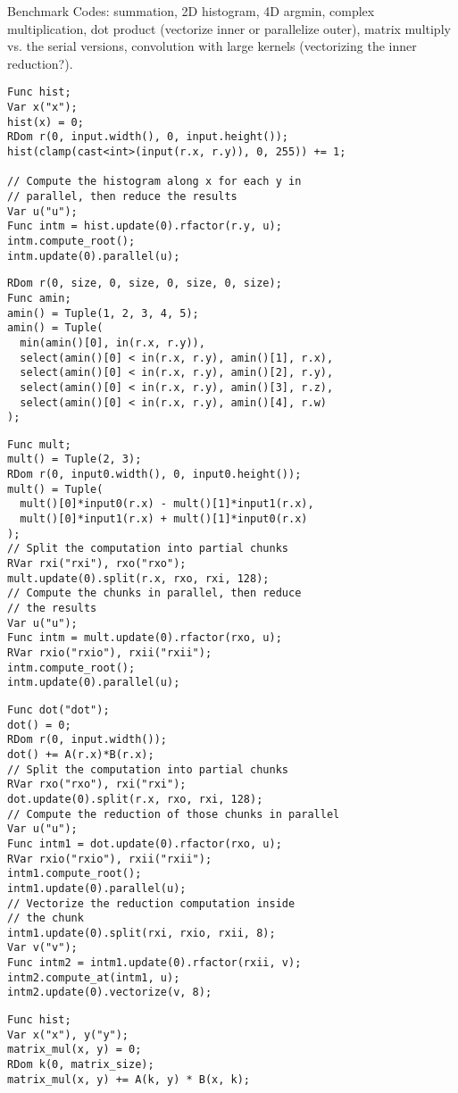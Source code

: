 Benchmark Codes:
summation, 2D histogram, 4D argmin, complex multiplication, dot product (vectorize inner or parallelize outer), matrix multiply vs. the serial versions, convolution with large kernels (vectorizing the inner reduction?). 

\begin{lstlisting}[caption={Benchmark code for histogram of a two-dimensional image.}, label={lst:benchmark_histogram}]
Func hist;
Var x("x");
hist(x) = 0;
RDom r(0, input.width(), 0, input.height());
hist(clamp(cast<int>(input(r.x, r.y)), 0, 255)) += 1;

// Compute the histogram along x for each y in
// parallel, then reduce the results
Var u("u");
Func intm = hist.update(0).rfactor(r.y, u);
intm.compute_root();
intm.update(0).parallel(u);
\end{lstlisting}

\begin{lstlisting}[caption={Benchmark code for argmin over 4D array}, label={lst:benchmark_argmin}]
RDom r(0, size, 0, size, 0, size, 0, size);
Func amin;
amin() = Tuple(1, 2, 3, 4, 5);
amin() = Tuple(
  min(amin()[0], in(r.x, r.y)),
  select(amin()[0] < in(r.x, r.y), amin()[1], r.x),
  select(amin()[0] < in(r.x, r.y), amin()[2], r.y),
  select(amin()[0] < in(r.x, r.y), amin()[3], r.z),
  select(amin()[0] < in(r.x, r.y), amin()[4], r.w)
);
\end{lstlisting}

\begin{lstlisting}[caption={Benchmark code for multiplication of complex number}, label={lst:benchmark_complex_multiply}]
Func mult;
mult() = Tuple(2, 3);
RDom r(0, input0.width(), 0, input0.height());
mult() = Tuple(
  mult()[0]*input0(r.x) - mult()[1]*input1(r.x),
  mult()[0]*input1(r.x) + mult()[1]*input0(r.x)
);
// Split the computation into partial chunks
RVar rxi("rxi"), rxo("rxo");
mult.update(0).split(r.x, rxo, rxi, 128);
// Compute the chunks in parallel, then reduce 
// the results
Var u("u");
Func intm = mult.update(0).rfactor(rxo, u);
RVar rxio("rxio"), rxii("rxii");
intm.compute_root();
intm.update(0).parallel(u);
\end{lstlisting}

\begin{lstlisting}[caption={Benchmark code for dot product}, label={lst:benchmark_dot_product}]
Func dot("dot");
dot() = 0;
RDom r(0, input.width());
dot() += A(r.x)*B(r.x);
// Split the computation into partial chunks
RVar rxo("rxo"), rxi("rxi");
dot.update(0).split(r.x, rxo, rxi, 128);
// Compute the reduction of those chunks in parallel
Var u("u");
Func intm1 = dot.update(0).rfactor(rxo, u);
RVar rxio("rxio"), rxii("rxii");
intm1.compute_root();
intm1.update(0).parallel(u);
// Vectorize the reduction computation inside 
// the chunk
intm1.update(0).split(rxi, rxio, rxii, 8);
Var v("v");
Func intm2 = intm1.update(0).rfactor(rxii, v);
intm2.compute_at(intm1, u);
intm2.update(0).vectorize(v, 8);
\end{lstlisting}

\begin{lstlisting}[caption={Benchmark code for square matrix multiplication.}, label={lst:benchmark_matrix}]
Func hist;
Var x("x"), y("y");
matrix_mul(x, y) = 0;
RDom k(0, matrix_size);
matrix_mul(x, y) += A(k, y) * B(x, k);
\end{lstlisting}
